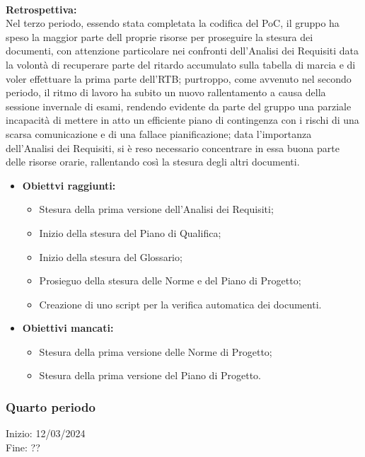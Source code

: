 \paragraph{}
\textbf{Retrospettiva:} \\
Nel terzo periodo, essendo stata completata la codifica del PoC, il gruppo ha speso la maggior parte dell proprie risorse per proseguire la stesura dei documenti, con attenzione
particolare nei confronti dell'Analisi dei Requisiti data la volontà di recuperare parte del ritardo accumulato sulla tabella di marcia e di voler effettuare la prima parte dell'RTB;
purtroppo, come avvenuto nel secondo periodo, il ritmo di lavoro ha subito un nuovo rallentamento a causa della sessione invernale di esami, rendendo evidente da parte del gruppo una 
parziale incapacità di mettere in atto un efficiente piano di contingenza con i rischi di una scarsa comunicazione e di una fallace pianificazione; data l'importanza dell'Analisi
dei Requisiti, si è reso necessario concentrare in essa buona parte delle risorse orarie, rallentando così la stesura degli altri documenti.
\begin{itemize} 
    \item \textbf{Obiettvi raggiunti:}
    \begin{itemize}
        \item Stesura della prima versione dell'Analisi dei Requisiti;
        \item Inizio della stesura del Piano di Qualifica;
        \item Inizio della stesura del Glossario;
        \item Prosieguo della stesura delle Norme e del Piano di Progetto;
        \item Creazione di uno script per la verifica automatica dei documenti.
    \end{itemize}
    \item \textbf{Obiettivi mancati:}
    \begin{itemize}
        \item Stesura della prima versione delle Norme di Progetto;
        \item Stesura della prima versione del Piano di Progetto.
    \end{itemize}
\end{itemize}

\subsubsection{Quarto periodo} 
Inizio: 12/03/2024 \\
Fine: ?? \\

